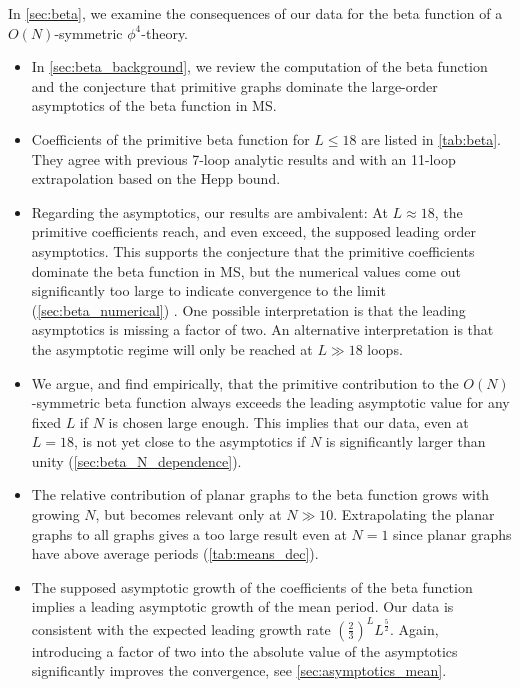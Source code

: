 \documentclass[11pt,a4paper]{article}
\renewcommand{\|}{\rule[-0.4ex]{0.2ex}{1.2em}}
\begin{document}
\noindent
In \cref{sec:beta}, we examine the consequences of our data for  the beta function of a $O(N)$-symmetric $\phi^4$-theory.
\begin{itemize}
	\item In \cref{sec:beta_background}, we review the computation  of the  beta function and the conjecture that primitive graphs dominate the large-order asymptotics of the beta function in MS. 
	\item Coefficients of the primitive beta function for $L \leq 18$ are listed in \cref{tab:beta}. They agree with previous 7-loop analytic results and with an 11-loop extrapolation based on the Hepp bound. 
	\item Regarding the asymptotics, our results are ambivalent: At $L \approx 18$, the primitive coefficients reach, and even exceed, the supposed leading order asymptotics. This supports the conjecture that the primitive coefficients dominate the beta function in MS, but the numerical values come out significantly too large to indicate convergence to the limit (\cref{sec:beta_numerical}) . One possible interpretation is that the leading asymptotics is missing a factor of two. An alternative interpretation is that the asymptotic regime will only be reached at $L \gg 18$ loops. 
	\item We argue, and find empirically, that the primitive contribution to the $O(N)$-symmetric beta function always exceeds the leading asymptotic value for any fixed $L$ if $N$ is chosen large enough. This implies that our data, even at $L=18$, is not yet close to the asymptotics if $N$ is significantly larger than unity (\cref{sec:beta_N_dependence}). 
	\item The relative contribution of planar graphs to the beta function grows with growing $N$, but becomes relevant only at $N \gg 10$. Extrapolating the planar graphs to all graphs gives a too large result even at $N=1$ since planar graphs have above average periods (\cref{tab:means_dec}).
	\item The supposed asymptotic growth of the coefficients of the beta function implies a leading asymptotic growth of the mean period. Our data is consistent with the expected leading growth rate $\left( \frac{2}{3} \right) ^L L^{\frac 5 2}$. Again, introducing a factor of two into the absolute value of the asymptotics significantly improves the convergence, see \cref{sec:asymptotics_mean}.
\end{itemize}
\end{document}
